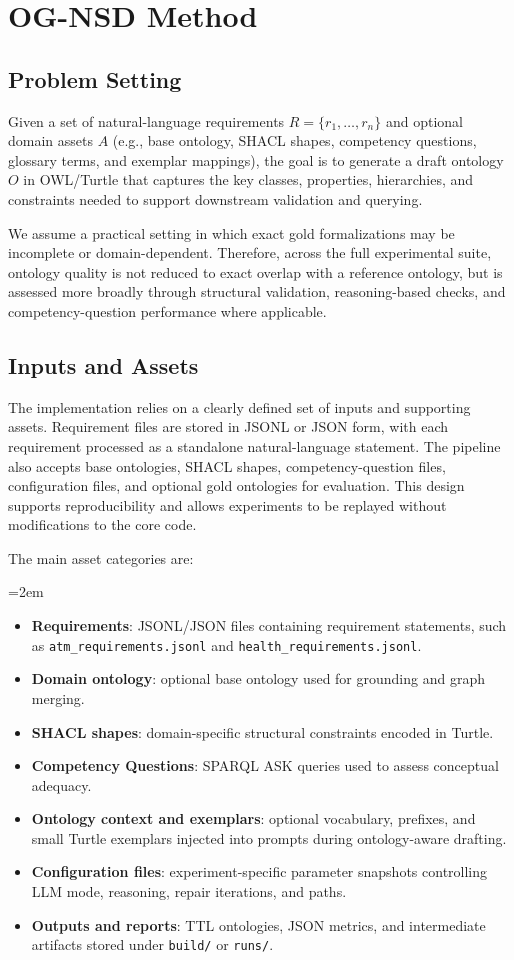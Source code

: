 \section{OG-NSD Method}

\subsection{Problem Setting}
Given a set of natural-language requirements $R=\{r_1,\ldots,r_n\}$ and optional domain assets $A$ (e.g., base ontology, SHACL shapes, competency questions, glossary terms, and exemplar mappings), the goal is to generate a draft ontology $O$ in OWL/Turtle that captures the key classes, properties, hierarchies, and constraints needed to support downstream validation and querying.

We assume a practical setting in which exact gold formalizations may be incomplete or domain-dependent. Therefore, across the full experimental suite, ontology quality is not reduced to exact overlap with a reference ontology, but is assessed more broadly through structural validation, reasoning-based checks, and competency-question performance where applicable.

\subsection{Inputs and Assets}
The implementation relies on a clearly defined set of inputs and supporting assets. Requirement files are stored in JSONL or JSON form, with each requirement processed as a standalone natural-language statement. The pipeline also accepts base ontologies, SHACL shapes, competency-question files, configuration files, and optional gold ontologies for evaluation. This design supports reproducibility and allows experiments to be replayed without modifications to the core code.

The main asset categories are:
{\emergencystretch=2em
\begin{itemize}
  \item \textbf{Requirements}: JSONL/JSON files containing requirement statements, such as \texttt{atm\_requirements.jsonl} and \texttt{health\_requirements.jsonl}.
  \item \textbf{Domain ontology}: optional base ontology used for grounding and graph merging.
  \item \textbf{SHACL shapes}: domain-specific structural constraints encoded in Turtle.
  \item \textbf{Competency Questions}: SPARQL ASK queries used to assess conceptual adequacy.
  \item \textbf{Ontology context and exemplars}: optional vocabulary, prefixes, and small Turtle exemplars injected into prompts during ontology-aware drafting.
  \item \textbf{Configuration files}: experiment-specific parameter snapshots controlling LLM mode, reasoning, repair iterations, and paths.
  \item \textbf{Outputs and reports}: TTL ontologies, JSON metrics, and intermediate artifacts stored under \texttt{build/} or \texttt{runs/}.
\end{itemize}}

